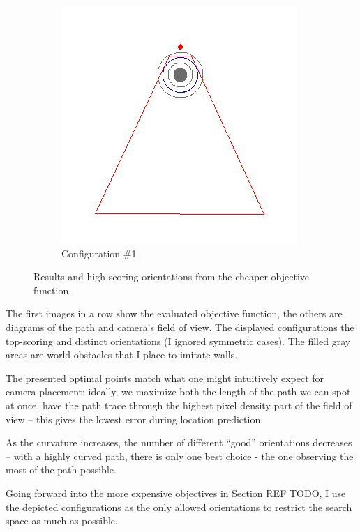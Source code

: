 \documentclass[a4paper,12pt,twoside,openright]{report}
\begin{document}
\begin{figure}[h!]
\begin{subfigure}[b]{0.25\textwidth}
    \includegraphics[width=\textwidth]{figures/simple_objective/radius_5m_pos1_small.png}
    \caption{Configuration \#1}
\end{subfigure}
\caption[Cheaper Objective Function Results]{Results and high scoring orientations from the cheaper objective function.}
\label{fig:simpleobjective}
\end{figure}

The first images in a row show the evaluated objective function, the others
are diagrams of the path and camera's field of view. The displayed
configurations the top-scoring and distinct orientations (I ignored
symmetric cases). The filled gray areas are world obstacles
that I place to imitate walls.

The presented optimal points match what one might intuitively expect 
for camera placement: ideally, we maximize both the length of the path
we can spot at once, have the path trace through the highest
pixel density part of the field of view -- this gives the lowest
error during location prediction.

As the curvature increases, the number of different ``good'' 
orientations decreases -- with a highly curved path, there is only
one best choice - the one observing the most of the path possible.

Going forward into the more expensive objectives in Section REF TODO, I use
the depicted configurations as the only allowed orientations to restrict
the search space as much as possible.
\end{document}
